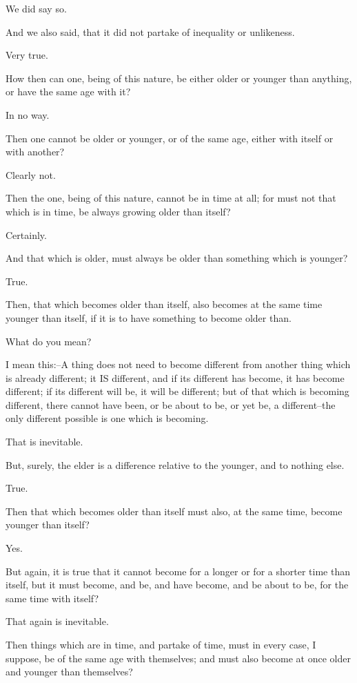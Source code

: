 We did say so.

And we also said, that it did not partake of inequality or unlikeness.

Very true.

How then can one, being of this nature, be either older or younger than
anything, or have the same age with it?

In no way.

Then one cannot be older or younger, or of the same age, either with
itself or with another?

Clearly not.

Then the one, being of this nature, cannot be in time at all; for must
not that which is in time, be always growing older than itself?

Certainly.

And that which is older, must always be older than something which is
younger?

True.

Then, that which becomes older than itself, also becomes at the same
time younger than itself, if it is to have something to become older
than.

What do you mean?

I mean this:--A thing does not need to become different from another
thing which is already different; it IS different, and if its different
has become, it has become different; if its different will be, it will
be different; but of that which is becoming different, there cannot
have been, or be about to be, or yet be, a different--the only different
possible is one which is becoming.

That is inevitable.

But, surely, the elder is a difference relative to the younger, and to
nothing else.

True.

Then that which becomes older than itself must also, at the same time,
become younger than itself?

Yes.

But again, it is true that it cannot become for a longer or for a
shorter time than itself, but it must become, and be, and have become,
and be about to be, for the same time with itself?

That again is inevitable.

Then things which are in time, and partake of time, must in every case,
I suppose, be of the same age with themselves; and must also become at
once older and younger than themselves?

